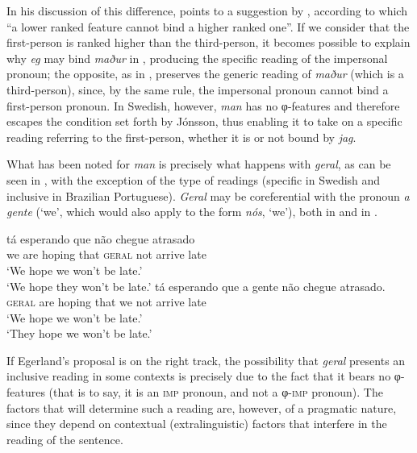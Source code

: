 \documentclass[output=paper]{langscibook}
\begin{document}
{In his discussion of this difference, \citet[98--99]{Egerland2003} points to a suggestion by \citet{Jónsson1992}, according to which “a lower ranked feature cannot bind a higher ranked one”. If we consider that the first-person is ranked higher than the third-person, it becomes possible to explain why} {\textit{eg} }{may bind} {\textit{maður} }{in , producing the specific reading of the impersonal pronoun; the opposite, as in , preserves the generic reading of} {\textit{maður} }{(which is a third-person), since, by the same rule, the impersonal pronoun cannot bind a first-person pronoun. In Swedish, however,} {\textit{man} }{has no φ-fea\-tures and therefore escapes the condition set forth by Jónsson, thus enabling it to take on a specific reading referring to the first-person, whether it is or not bound by} {\textit{jag}}.

{What has been noted for} {\textit{man} }{is precisely what happens with} {\textit{geral}}{, as can be seen in , with the exception of the type of readings (specific in Swedish and inclusive in Brazilian Portuguese).} {\textit{Geral} }{may be coreferential with the pronoun} {\textit{a gente} }{(‘we’, which would also apply to the form} {\textit{nós}}{, ‘we’), both in  and in .}

\ea\label{ex:avelar:39}
 \ea\label{ex:avelar:39a} 
     tá esperando   que  não   chegue   atrasado\\
         we       are hoping   that   \textsc{geral}   not   arrive     late\\
  \glt ‘We hope we won’t be late.’\\ ‘We hope they won’t be late.’
 \ex\label{ex:avelar:39b} 
  \gll {} tá esperando   que  {a gente}   não   chegue   atrasado.\\
         \textsc{geral}   are hoping   that   we       not   arrive     late\\
  \glt ‘We hope we won’t be late.’ \\ ‘They hope we won’t be late.’
\z 
\z

If Egerland’s proposal is on the right track, the possibility that \textit{geral} presents an inclusive reading in some contexts is precisely due to the fact that it bears no φ-fea\-tures (that is to say, it is an \textsc{imp} pronoun, and not a φ-\textsc{imp} pronoun). The factors that will determine such a reading are, however, of a pragmatic nature, since they depend on contextual (extralinguistic) factors that interfere in the reading of the sentence.
\end{document}
